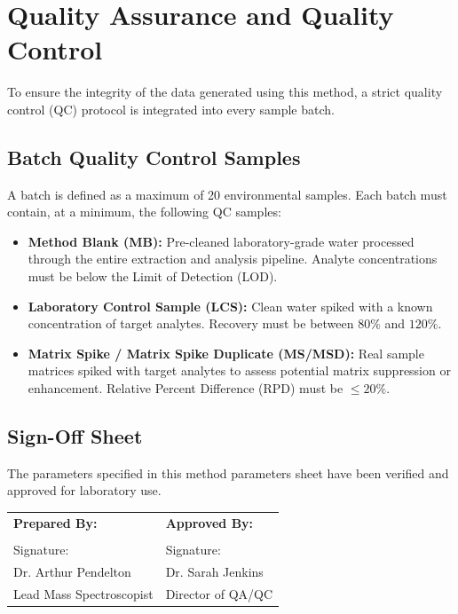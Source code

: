 \section{Quality Assurance and Quality Control}
To ensure the integrity of the data generated using this method, a strict quality control (QC) protocol is integrated into every sample batch.

\subsection{Batch Quality Control Samples}
A batch is defined as a maximum of 20 environmental samples. Each batch must contain, at a minimum, the following QC samples:
\begin{itemize}
    \item \textbf{Method Blank (MB):} Pre-cleaned laboratory-grade water processed through the entire extraction and analysis pipeline. Analyte concentrations must be below the Limit of Detection (LOD).
    \item \textbf{Laboratory Control Sample (LCS):} Clean water spiked with a known concentration of target analytes. Recovery must be between $80\%$ and $120\%$.
    \item \textbf{Matrix Spike / Matrix Spike Duplicate (MS/MSD):} Real sample matrices spiked with target analytes to assess potential matrix suppression or enhancement. Relative Percent Difference (RPD) must be $\le 20\%$.
\end{itemize}

\subsection{Sign-Off Sheet}
The parameters specified in this method parameters sheet have been verified and approved for laboratory use.

\vspace{1cm}
\begin{tabularx}{\textwidth}{X X}
    \toprule
    \textbf{Prepared By:} & \textbf{Approved By:} \\
    \vspace{1.5cm} & \vspace{1.5cm} \\
    Signature: \hrulefill & Signature: \hrulefill \\
    Dr. Arthur Pendelton & Dr. Sarah Jenkins \\
    Lead Mass Spectroscopist & Director of QA/QC \\
    \bottomrule
\end{tabularx}
